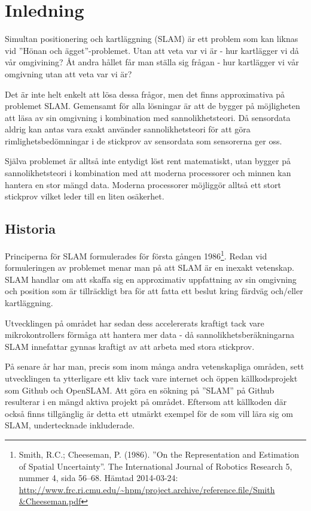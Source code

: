 \documentclass[a4paper,12pt,fleqn]{article}
\begin{document}
\section{Inledning}

Simultan positionering och kartläggning (SLAM) är ett problem som kan
liknas vid ''Hönan och ägget''-problemet. Utan att veta var vi är - hur
kartlägger vi då vår omgivining? Åt andra hållet får man ställa sig
frågan - hur kartlägger vi vår omgivning utan att veta var vi är?

Det är inte helt enkelt att lösa dessa frågor, men det finns
approximativa på problemet SLAM. Gemensamt för alla lösningar är att de
bygger på möjligheten att läsa av sin omgivning i kombination med
sannolikhetsteori. Då sensordata aldrig kan antas vara exakt använder
sannolikhetsteori för att göra rimlighetsbedömningar i de stickprov av
sensordata som sensorerna ger oss.

Själva problemet är alltså inte entydigt löst rent matematiskt, utan
bygger på sannolikhetsteori i kombination med att moderna processorer
och minnen kan hantera en stor mängd data. Moderna processorer möjliggör
alltså ett stort stickprov vilket leder till en liten osäkerhet.

\subsection{Historia}

Principerna för SLAM formulerades för första gången 1986\footnote{Smith,
R.C.; Cheeseman, P. (1986). ''On the Representation and Estimation of
Spatial Uncertainty''. The International Journal of Robotics Research 5,
nummer 4, sida 56–68. Hämtad 2014-03-24:
\url{http://www.frc.ri.cmu.edu/~hpm/project.archive/reference.file/Smith
&Cheeseman.pdf}}. Redan vid formuleringen av problemet menar man på att
SLAM är en inexakt vetenskap. SLAM handlar om att skaffa sig en
approximativ uppfattning av sin omgivning och position som är
tillräckligt bra för att fatta ett beslut kring färdväg och/eller
kartläggning.

Utvecklingen på området har sedan dess accelererats kraftigt tack vare
mikrokontrollers förmåga att hantera mer data - då
sannolikhetsberäkningarna SLAM innefattar gynnas kraftigt av att arbeta
med stora stickprov.

På senare år har man, precis som inom många andra vetenskapliga områden,
sett utvecklingen ta ytterligare ett kliv tack vare internet och öppen
källkodsprojekt som Github och OpenSLAM. Att göra en sökning på ''SLAM''
på Github resulterar i en mängd aktiva projekt på området. Eftersom att
källkoden där också finns tillgänglig är detta ett utmärkt exempel för
de som vill lära sig om SLAM, undertecknade inkluderade.
\end{document}
